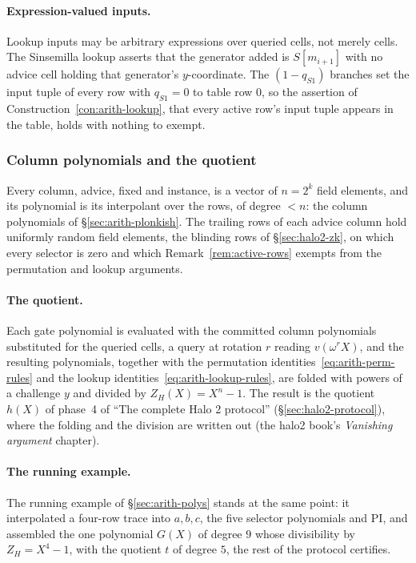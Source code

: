 \documentclass[11pt,a4paper]{article}
\theoremstyle{definition}
\newcommand{\ZH}{Z_H}
\begin{document}
\paragraph{Expression-valued inputs.}
Lookup inputs may be arbitrary expressions over queried cells, not merely
cells. The Sinsemilla lookup asserts that the generator added is
$S[m_{i+1}]$ with no advice cell holding that generator's $y$-coordinate.
The $(1 - q_{S1})$ branches set the input tuple of every row with
$q_{S1} = 0$ to table row $0$, so the assertion of
Construction~\ref{con:arith-lookup}, that every active row's input tuple
appears in the table, holds with nothing to exempt.

\subsubsection{Column polynomials and the quotient}
\label{sec:halo2-handoff}

Every column, advice, fixed and instance, is a vector of $n = 2^{k}$
field elements, and its polynomial is its interpolant over the rows, of
degree $< n$: the column polynomials of \S\ref{sec:arith-plonkish}. The
trailing rows of each advice column hold uniformly random field
elements, the blinding rows of \S\ref{sec:halo2-zk}, on which every
selector is zero and which Remark~\ref{rem:active-rows} exempts from the
permutation and lookup arguments.

\paragraph{The quotient.}
Each gate polynomial is evaluated with the committed column polynomials
substituted for the queried cells, a query at rotation $r$ reading
$v(\omega^{r}X)$, and the resulting polynomials, together with the
permutation identities~\eqref{eq:arith-perm-rules} and the lookup
identities~\eqref{eq:arith-lookup-rules}, are folded with powers of a
challenge $y$ and divided by $\ZH(X) = X^{n} - 1$. The result is the
quotient $h(X)$ of phase~4 of ``The complete Halo 2 protocol''
(\S\ref{sec:halo2-protocol}), where the folding and the division are
written out (the halo2 book's \emph{Vanishing argument} chapter).

\paragraph{The running example.}
The running example of \S\ref{sec:arith-polys} stands at the same point:
it interpolated a four-row trace into $a, b, c$, the five selector
polynomials and $\mathrm{PI}$, and assembled the one polynomial $G(X)$ of
degree $9$ whose divisibility by $\ZH = X^{4} - 1$, with the quotient $t$
of degree $5$, the rest of the protocol certifies.
\end{document}
